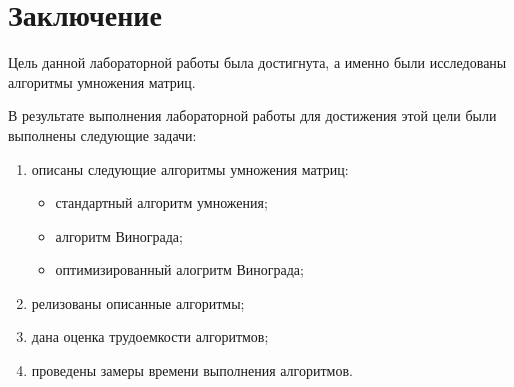 \chapter*{Заключение}

Цель данной лабораторной работы была достигнута, а именно были исследованы алгоритмы умножения матриц.

В результате выполнения лабораторной работы для достижения этой цели были выполнены следующие задачи:
\begin{enumerate}
    \item описаны следующие алгоритмы умножения матриц:
        \begin{itemize}
            \item стандартный алгоритм умножения;
            \item алгоритм Винограда;
            \item оптимизированный алогритм Винограда;
        \end{itemize}
    \item релизованы описанные алгоритмы;
    \item дана оценка трудоемкости алгоритмов;
    \item проведены замеры времени выполнения алгоритмов.
\end{enumerate}